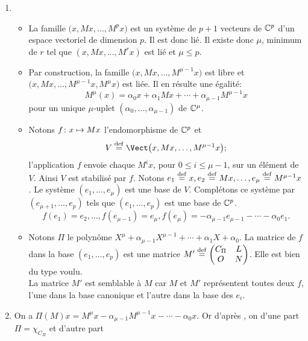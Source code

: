 \begin{solution}
    \begin{enumerate}
        \item 
        \begin{itemize}
            \item La famille $\big(x, Mx, \dots, M^p x\big)$ est un système de $p+1$ vecteurs de $\mathbb{C}^p$ d'un espace vectoriel de dimension $p$. Il est donc lié. Il existe donc $\mu$, minimum de $r$ tel que $(x, Mx, \dots, M^r x)$ est lié et $\mu \leqslant p$. 
            \item Par construction, la famille  $\big(x, Mx, \dots, M^{\mu-1} x\big)$ est libre et $\big(x, Mx, \dots, M^{\mu-1} x, M^\mu x\big)$ est liée. Il en résulte une égalité: 
            $$M^\mu(x) = \alpha_0 x + \alpha_1 M x + \cdots + \alpha_{\mu-1} M^{\mu-1} x$$
            pour un unique $\mu$-uplet $(\alpha_0, \dots, \alpha_{\mu-1})$ de $\mathbb{C}^\mu$. \\
            \item Notons $f \colon x \mapsto Mx$ l'endomorphisme de $\mathbb{C}^p$ et 
            $$V \defeq \Vect\big(x, Mx, \dots, M^{\mu-1} x\big);$$
            l'application $f$ envoie chaque $M^i x$, pour $0 \leqslant i \leqslant \mu - 1$, sur un élément de $V$. Ainsi $V$ est stabilisé par $f$.
            Notons $e_1 \overset{\mathrm{\tiny def}}{=} x, e_2 \overset{\mathrm{\tiny def}}{=} M x, \dots, e_\mu \overset{\mathrm{\tiny def}}{=} M^{\mu-1} x$. Le système $(e_1, \dots, e_\mu)$ est une base de $V$. Complétons ce système par $(e_{\mu+1}, \dots, e_p)$ tels que $(e_1, \dots, e_p)$ est une base de $\mathbb{C}^p$. 
            $$f(e_1) = e_2, \dots, f(e_{\mu-1}) = e_\mu, f(e_\mu) = -\alpha_{\mu-1} e_{\mu-1} - \cdots - \alpha_0 e_1.$$
            \item Notons $\Pi$ le polynôme $X^\mu + \alpha_{\mu-1} X^{\mu-1} + \cdots + \alpha_1 X + \alpha_0$. La matrice de $f$ dans la base $(e_1, \dots, e_p)$ est une matrice 
            $M' \overset{\mathrm{\tiny def}}{=}
            \begin{pmatrix}
                C_\Pi & L \\
                O & N
            \end{pmatrix}
            $. Elle est bien du type voulu. \\
            La matrice $M'$ est semblable à $M$ car $M$ et $M'$ représentent toutes deux $f$, l'une dans la base canonique et l'autre dans la base des $e_i$. 
        \end{itemize}
        \item On a $\Pi(M)x = M^\mu x - \alpha_{\mu-1}M^{\mu-1}x - \cdots - \alpha_0 x$. Or d'après , on d'une part $\Pi = \chi_{C_\Pi}$ et d'autre part 

\end{enumerate}
\end{solution}
